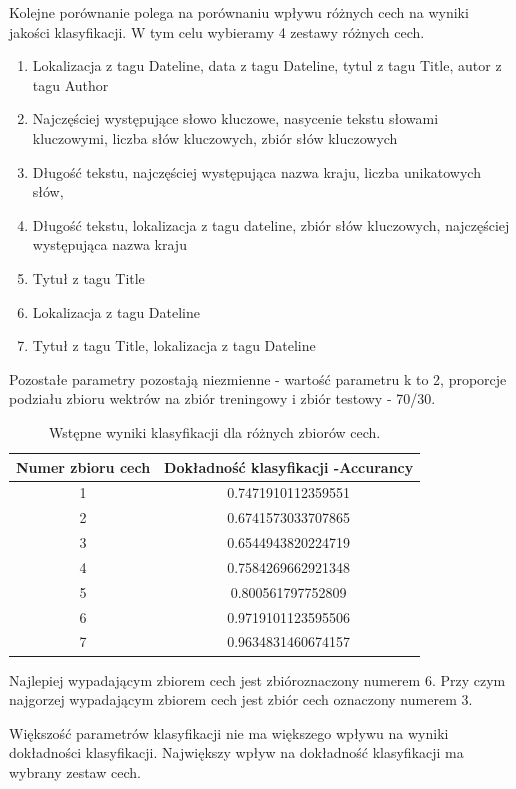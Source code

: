 \documentclass{classrep}
\begin{document}
Kolejne porównanie polega na porównaniu wpływu różnych cech na wyniki jakości klasyfikacji. W tym celu wybieramy 4 zestawy różnych cech. 
\begin{enumerate}
\item Lokalizacja z tagu Dateline, data z tagu Dateline, tytul z tagu Title, autor z tagu Author
\item Najczęściej występujące słowo kluczowe, nasycenie tekstu słowami kluczowymi, liczba słów kluczowych, zbiór słów kluczowych
\item Długość tekstu, najczęściej występująca nazwa kraju, liczba unikatowych słów, 
\item Długość tekstu, lokalizacja z tagu dateline, zbiór słów kluczowych, najczęściej występująca nazwa kraju
\item Tytuł z tagu Title
\item Lokalizacja z tagu Dateline
\item Tytuł z tagu Title, lokalizacja z tagu Dateline
\end{enumerate}

Pozostałe parametry pozostają niezmienne - wartość parametru k to 2, proporcje podziału zbioru wektrów na zbiór treningowy i zbiór testowy - 70/30. 

\begin{table}[h!]
 \caption{Wstępne wyniki klasyfikacji dla różnych zbiorów cech.}
 \centering
 \vspace{0.1cm}
 \begin{tabular}{c c}
  \textbf{Numer zbioru cech} & \textbf{Dokładność klasyfikacji -Accurancy}\\
\hline
  1 & 0.7471910112359551\\
  2 &  0.6741573033707865\\
  3 &  0.6544943820224719\\
  4 & 0.7584269662921348\\
5 & 0.800561797752809\\
6 &0.9719101123595506\\
7 &0.9634831460674157\\
 \end{tabular}
 \label{wyniki klasyfikacji dla roznych 10 wartosci parametru k}
\end{table}

Najlepiej wypadającym zbiorem cech jest zbióroznaczony numerem 6. Przy czym najgorzej wypadającym zbiorem cech jest zbiór cech oznaczony numerem 3. 

Większość parametrów klasyfikacji nie ma większego wpływu na wyniki dokładności klasyfikacji. Największy wpływ na dokładność klasyfikacji ma wybrany zestaw cech. 
\end{document}
